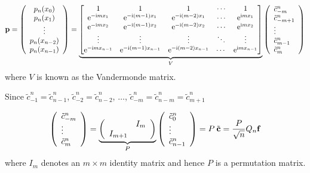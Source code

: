 \documentclass[12pt,a4paper]{article}
\begin{document}
\[
\mathbf{p} = \left(
\begin{array}{c}
p_n(x_0) \\
p_n(x_1) \\
\vdots \\
p_n(x_{n-2}) \\
p_n(x_{n-1})
\end{array}
\right)
=
\underbrace{\begin{bmatrix}
1 & 1 & 1&  \ensuremath{\cdots} & 1 \\
{\rm e}^{-{\rm i}m x_1} & {\rm e}^{-{\rm i}(m-1) x_1} &  {\rm e}^{-{\rm i}(m-2) x_1} & \ensuremath{\cdots} & {\rm e}^{{\rm i} m x_1} \\
{\rm e}^{-{\rm i}m x_2} & {\rm e}^{-{\rm i}(m-1) x_2} &  {\rm e}^{-{\rm i}(m-2) x_2} & \ensuremath{\cdots} & {\rm e}^{{\rm i} m x_2} \\
\ensuremath{\vdots} & \ensuremath{\vdots} & \ensuremath{\vdots} & \ensuremath{\ddots} & \ensuremath{\vdots} \\
{\rm e}^{-{\rm i}m x_{n-1}}& {\rm e}^{-{\rm i}(m-1)x_{n-1}}& {\rm e}^{-{\rm i}(m-2)x_{n-1}}& \cdots & {\rm e}^{{\rm i}m x_{n-1}}
\end{bmatrix}}_{V} 
\left(
\begin{array}{l}
\tilde{c}^n_{-m} \\
\tilde{c}^n_{-m+1} \\
\vdots \\
\tilde{c}^n_{m-1} \\
\tilde{c}^n_{m}
\end{array}
\right)
\]
where $V$ is known as the Vandermonde matrix.

Since $\tilde{c}^n_{-1} = \tilde{c}^n_{n-1}$, $\tilde{c}^n_{-2} = \tilde{c}^n_{n-2}$, $\ldots$, $\tilde{c}^n_{-m} = \tilde{c}^n_{n-m} = \tilde{c}^n_{m+1}$

\[
\left(
\begin{array}{l}
\tilde{c}^n_{-m} \\
\vdots \\
\tilde{c}^n_{m}
\end{array}
\right) = 
\underbrace{\left(
\begin{array}{c c}
   & I_{m} \\
I_{m+1} & 
\end{array}
\right)}_{P}
\left(
\begin{array}{l}
\tilde{c}^n_{0} \\
\vdots \\
\tilde{c}^n_{n-1}
\end{array}
\right) = P\: \tilde{\mathbf{c}} = \frac{P}{\sqrt{n}}Q_{n}\mathbf{f}
\]
where $I_m$ denotes an $m\times m$ identity matrix and hence $P$ is a permutation matrix.
\end{document}
